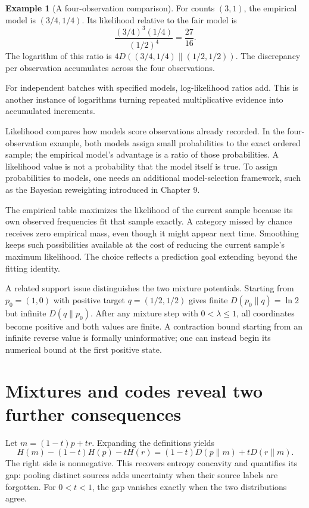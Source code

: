 \documentclass[11pt,oneside,openany]{book}
\theoremstyle{definition}
\newtheorem{example}{Example}[chapter]
\theoremstyle{remark}
\numberwithin{equation}{chapter}
\begin{document}
\begin{example}[A four-observation comparison]

For counts \((3,1)\), the empirical model is \((3/4,1/4)\). Its likelihood relative to the fair model is \[\frac{(3/4)^3(1/4)}{(1/2)^4}=\frac{27}{16}.\] The logarithm of this ratio is \(4D((3/4,1/4)\|(1/2,1/2))\). The discrepancy per observation accumulates across the four observations.

\end{example}

For independent batches with specified models, log-likelihood ratios add. This is another instance of logarithms turning repeated multiplicative evidence into accumulated increments.

Likelihood compares how models score observations already recorded. In the four-observation example, both models assign small probabilities to the exact ordered sample; the empirical model's advantage is a ratio of those probabilities. A likelihood value is not a probability that the model itself is true. To assign probabilities to models, one needs an additional model-selection framework, such as the Bayesian reweighting introduced in Chapter 9.

The empirical table maximizes the likelihood of the current sample because its own observed frequencies fit that sample exactly. A category missed by chance receives zero empirical mass, even though it might appear next time. Smoothing keeps such possibilities available at the cost of reducing the current sample's maximum likelihood. The choice reflects a prediction goal extending beyond the fitting identity.

A related support issue distinguishes the two mixture potentials. Starting from \(p_0=(1,0)\) with positive target \(q=(1/2,1/2)\) gives finite \(D(p_0\|q)=\ln2\) but infinite \(D(q\|p_0)\). After any mixture step with \(0<\lambda\leq1\), all coordinates become positive and both values are finite. A contraction bound starting from an infinite reverse value is formally uninformative; one can instead begin its numerical bound at the first positive state.

\section{Mixtures and codes reveal two further consequences}\label{ch06-mixtures-and-codes-reveal-two-further-consequences}

Let \(m=(1-t)p+tr\). Expanding the definitions yields \[H(m)-(1-t)H(p)-tH(r)
=(1-t)D(p\|m)+tD(r\|m).\] The right side is nonnegative. This recovers entropy concavity and quantifies its gap: pooling distinct sources adds uncertainty when their source labels are forgotten. For \(0<t<1\), the gap vanishes exactly when the two distributions agree.
\end{document}
